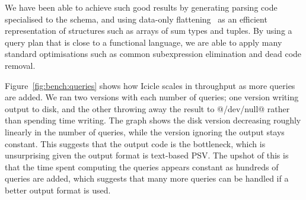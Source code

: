 We have been able to achieve such good results by generating parsing code specialised to the schema, and using data-only flattening~\cite{bergstrom2013data} as an efficient representation of structures such as arrays of sum types and tuples.
By using a query plan that is close to a functional language, we are able to apply many standard optimisations such as common subexpression elimination and dead code removal.






Figure~\ref{fig:bench:queries} shows how Icicle scales in throughput as more queries are added.
We ran two versions with each number of queries; one version writing output to disk, and the other throwing away the result to @/dev/null@ rather than spending time writing.
The graph shows the disk version decreasing roughly linearly in the number of queries, while the version ignoring the output stays constant.
This suggests that the output code is the bottleneck, which is unsurprising given the output format is text-based PSV.
The upshot of this is that the time spent computing the queries appears constant as hundreds of queries are added, which suggests that many more queries can be handled if a better output format is used.

